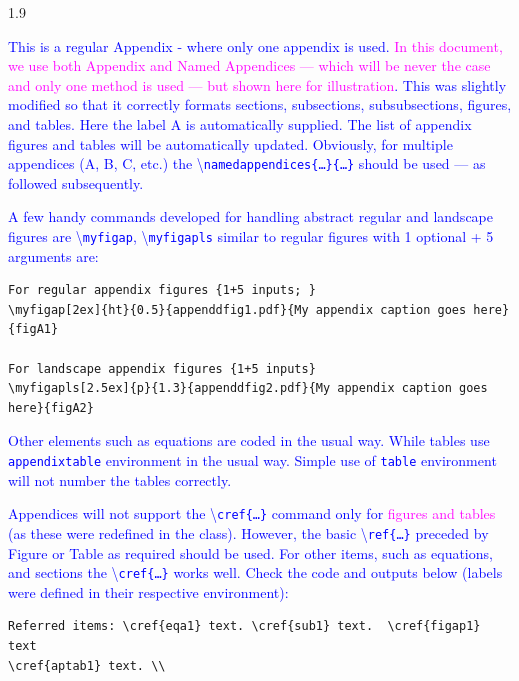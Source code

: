 \documentclass[phd]{ndsu-thesis-2022}
\newcommand{\makebib}{\biblio{apalike}{mybib}} %
\newcommand\myspacing{1.9} %
\newcommand\italk[1]{\textcolor{blue}{#1}}  %
\newcommand\cmd[1]{\textbackslash\texttt{#1}}  %
\begin{document}
\begin{spacing}{\myspacing}
\makebib  %
\label{biblio}

\appendix %

\italk{This is a regular Appendix - where only one appendix is used. \textcolor{magenta}{In this document, we use both Appendix and Named Appendices --- which will be never the case and only one method is used --- but shown here for illustration}. This was slightly modified so that it correctly formats sections, subsections, subsubsections, figures, and tables. Here the label A is automatically supplied. The list of appendix figures and tables will be automatically updated. Obviously, for multiple appendices (A, B, C, etc.) the \cmd{namedappendices\{\ldots\}\{\ldots\}} should be used --- as followed subsequently.}

\italk{A few handy commands developed for handling abstract regular and landscape figures are \cmd{myfigap}, \cmd{myfigapls} similar to regular figures with 1 optional + 5 arguments are: } 

\label{figv}
\vspace{2ex}
{\singlespacing
\begin{verbatim}
For regular appendix figures {1+5 inputs; }
\myfigap[2ex]{ht}{0.5}{appenddfig1.pdf}{My appendix caption goes here}{figA1}

For landscape appendix figures {1+5 inputs}
\myfigapls[2.5ex]{p}{1.3}{appenddfig2.pdf}{My appendix caption goes here}{figA2}
\end{verbatim}
}

\italk{Other elements such as equations are coded in the usual way. While tables use \texttt{appendixtable} environment in the usual way. Simple use of \texttt{table} environment will not number the tables correctly.}

\italk{Appendices will not support the \cmd{cref\{\ldots\}} command only for \textcolor{magenta}{figures and tables} (as these were redefined in the class). However, the basic \cmd{ref\{\ldots\}} preceded by Figure or Table as required should be used. For other items, such as equations, and sections the \cmd{cref\{\ldots\}} works well. Check the code and outputs below (labels were defined in their respective environment):}

{\singlespacing
\begin{verbatim}
Referred items: \cref{eqa1} text. \cref{sub1} text.  \cref{figap1} text 
\cref{aptab1} text. \\


\end{verbatim}}
\end{spacing}
\end{document}
